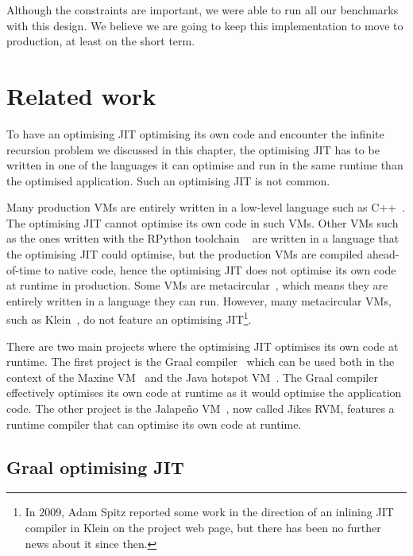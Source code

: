 \documentclass[a4paper,12pt,twoside]{../includes/ThesisStyle}
\begin{document}
Although the constraints are important, we were able to run all our benchmarks with this design. We believe we are going to keep this implementation to move to production, at least on the short term.


\section{Related work}
\label{sec:recRelW}

To have an optimising JIT optimising its own code and encounter the infinite recursion problem we discussed in this chapter, the optimising JIT has to be written in one of the languages it can optimise and run in the same runtime than the optimised application. Such an optimising JIT is not common.

Many production VMs are entirely written in a low-level language such as C++~\cite{V8,Webkit15}. The optimising JIT cannot optimise its own code in such VMs. Other VMs such as the ones written with the RPython toolchain ~\cite{Rigo06a} are written in a language that the optimising JIT could optimise, but the production VMs are compiled ahead-of-time to native code, hence the optimising JIT does not optimise its own code at runtime in production. Some VMs are metacircular~\cite{Unga05b,Alp99a}, which means they are entirely written in a language they can run. However, many metacircular VMs, such as Klein~\cite{Unga05b}, do not feature an optimising JIT\footnote{In 2009, Adam Spitz reported some work in the direction of an inlining JIT compiler in Klein on the project web page, but there has been no further news about it since then.}. 

There are two main projects where the optimising JIT optimises its own code at runtime. The first project is the Graal compiler~\cite{Oracle13,Dubo13c} which can be used both in the context of the Maxine VM~\cite{Wimm13a} and the Java hotspot VM~\cite{Pale01a}. The Graal compiler effectively optimises its own code at runtime as it would optimise the application code. The other project is the Jalape\~no VM~\cite{Alp99a}, now called Jikes RVM, features a runtime compiler that can optimise its own code at runtime. 

\subsection{Graal optimising JIT}
\end{document}
